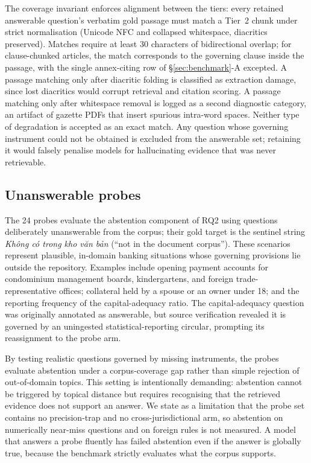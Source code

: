 \documentclass[conference,a4paper]{IEEEtran}
\begin{document}
The coverage invariant enforces alignment between the tiers: every retained answerable question's verbatim gold passage must match a Tier~2 chunk under strict normalisation (Unicode NFC and collapsed whitespace, diacritics preserved). Matches require at least 30 characters of bidirectional overlap; for clause-chunked articles, the match corresponds to the governing clause inside the passage, with the single annex-citing row of \S\ref{sec:benchmark}-A excepted. A passage matching only after diacritic folding is classified as extraction damage, since lost diacritics would corrupt retrieval and citation scoring. A passage matching only after whitespace removal is logged as a second diagnostic category, an artifact of gazette PDFs that insert spurious intra-word spaces. Neither type of degradation is accepted as an exact match. Any question whose governing instrument could not be obtained is excluded from the answerable set; retaining it would falsely penalise models for hallucinating evidence that was never retrievable.

\subsection{Unanswerable probes}
The 24 probes evaluate the abstention component of RQ2 using questions deliberately unanswerable from the corpus; their gold target is the sentinel string \emph{Không có trong kho văn bản} (``not in the document corpus''). These scenarios represent plausible, in-domain banking situations whose governing provisions lie outside the repository. Examples include opening payment accounts for condominium management boards, kindergartens, and foreign trade-representative offices; collateral held by a spouse or an owner under 18; and the reporting frequency of the capital-adequacy ratio. The capital-adequacy question was originally annotated as answerable, but source verification revealed it is governed by an uningested statistical-reporting circular, prompting its reassignment to the probe arm.

By testing realistic questions governed by missing instruments, the probes evaluate abstention under a corpus-coverage gap rather than simple rejection of out-of-domain topics. This setting is intentionally demanding: abstention cannot be triggered by topical distance but requires recognising that the retrieved evidence does not support an answer. We state as a limitation that the probe set contains no precision-trap and no cross-jurisdictional arm, so abstention on numerically near-miss questions and on foreign rules is not measured. A model that answers a probe fluently has failed abstention even if the answer is globally true, because the benchmark strictly evaluates what the corpus supports.
\end{document}

